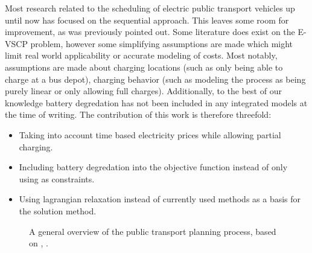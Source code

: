 \documentclass[]{article}
\begin{document}
Most research related to the scheduling of electric public transport vehicles up until now has focused on the sequential approach. This leaves some room for improvement, as was previously pointed out. Some literature does exist on the E-VSCP problem, however some simplifying assumptions are made which might limit real world applicability or accurate modeling of costs. Most notably, assumptions are made about charging locations (such as only being able to charge at a bus depot), charging behavior (such as modeling the process as being purely linear or only allowing full charges). Additionally, to the best of our knowledge battery degredation has not been included in any integrated models at the time of writing. The contribution of this work is therefore threefold: 
\begin{itemize}
  \item Taking into account time based electricity prices while allowing partial charging. 
  \item Including battery degredation into the objective function instead of only using as constraints.
  \item Using lagrangian relaxation instead of currently used methods as a basis for the solution method. 
\end{itemize}
\begin{figure}[h]
\centering
{}
\caption{A general overview of the public transport planning process, based on \cite{IBARRAROJAS201538}, \cite{PERUMAL2022395}.}
\label{fig:planning-overview}
\end{figure}
\end{document}

